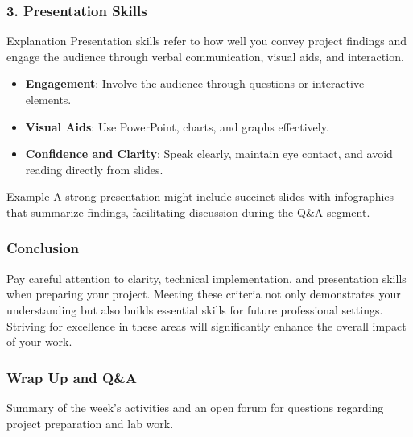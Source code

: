 \documentclass[aspectratio=169]{beamer}
\begin{document}
\begin{frame}[fragile]
    \frametitle{3. Presentation Skills}
    \begin{block}{Explanation}
        Presentation skills refer to how well you convey project findings and engage the audience through verbal communication, visual aids, and interaction.
    \end{block}
    \begin{itemize}
        \item \textbf{Engagement}: Involve the audience through questions or interactive elements.
        \item \textbf{Visual Aids}: Use PowerPoint, charts, and graphs effectively.
        \item \textbf{Confidence and Clarity}: Speak clearly, maintain eye contact, and avoid reading directly from slides.
    \end{itemize}
    \begin{block}{Example}
        A strong presentation might include succinct slides with infographics that summarize findings, facilitating discussion during the Q\&A segment.
    \end{block}
\end{frame}

\begin{frame}[fragile]
    \frametitle{Conclusion}
    Pay careful attention to clarity, technical implementation, and presentation skills when preparing your project. Meeting these criteria not only demonstrates your understanding but also builds essential skills for future professional settings. Striving for excellence in these areas will significantly enhance the overall impact of your work.
\end{frame}

\begin{frame}[fragile]
    \frametitle{Wrap Up and Q\&A}
    Summary of the week’s activities and an open forum for questions regarding project preparation and lab work.
\end{frame}
\end{document}
